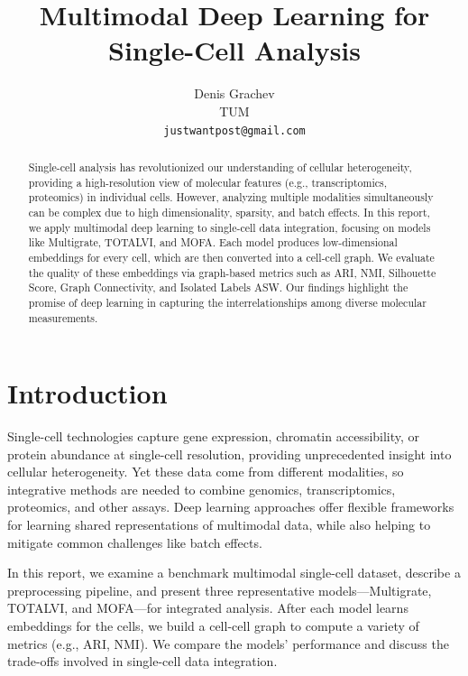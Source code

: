 \documentclass{article}
\title{Multimodal Deep Learning for Single-Cell Analysis}
\author{%
  Denis Grachev \\
  TUM \\
  \texttt{justwantpost@gmail.com} \\
}
\begin{document}
\maketitle

\begin{abstract}
Single-cell analysis has revolutionized our understanding of cellular heterogeneity, 
providing a high-resolution view of molecular features (e.g., transcriptomics, proteomics) 
in individual cells. However, analyzing multiple modalities simultaneously can be complex 
due to high dimensionality, sparsity, and batch effects. In this report, we apply 
multimodal deep learning to single-cell data integration, focusing on models like 
Multigrate, TOTALVI, and MOFA. Each model produces low-dimensional embeddings for every cell, 
which are then converted into a cell-cell graph. We evaluate the quality of these embeddings 
via graph-based metrics such as ARI, NMI, Silhouette Score, Graph Connectivity, 
and Isolated Labels ASW. Our findings highlight the promise of deep learning in capturing 
the interrelationships among diverse molecular measurements.
\end{abstract}

\section{Introduction}
Single-cell technologies capture gene expression, chromatin accessibility, or protein abundance 
at single-cell resolution, providing unprecedented insight into cellular heterogeneity. 
Yet these data come from different modalities, so integrative methods are needed to combine 
genomics, transcriptomics, proteomics, and other assays. Deep learning approaches 
offer flexible frameworks for learning shared representations of multimodal data, 
while also helping to mitigate common challenges like batch effects.

In this report, we examine a benchmark multimodal single-cell dataset, describe 
a preprocessing pipeline, and present three representative models---Multigrate, TOTALVI, and MOFA---for integrated analysis. 
After each model learns embeddings for the cells, we build a cell-cell graph 
to compute a variety of metrics (e.g., ARI, NMI). We compare the models’ performance 
and discuss the trade-offs involved in single-cell data integration.
\end{document}
